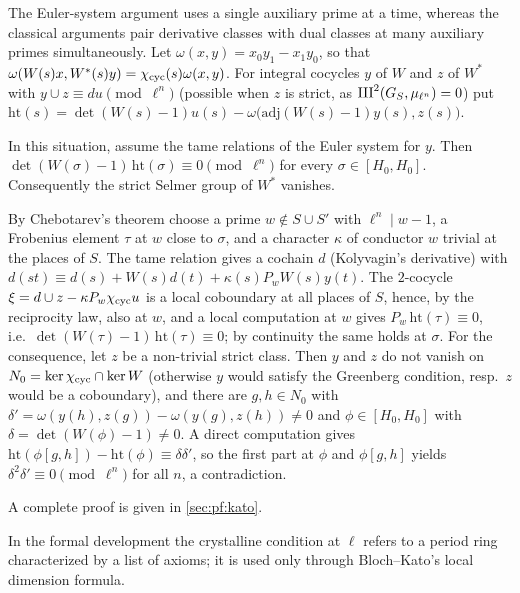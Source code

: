 The Euler-system argument uses a single auxiliary prime at a time, whereas the classical arguments
\cite{Kolyvagin1990,Rubin2000} pair derivative classes with dual classes at many auxiliary primes simultaneously. Let
$\omega(x,y)=x_0y_1-x_1y_0$, so that
$\omega(W(s)x,W^*(s)y)=\chi_{\mathrm{cyc}}(s)\omega(x,y)$. For integral cocycles $y$ of $W$ and $z$ of $W^*$ with
$y\cup z\equiv du\pmod{\ell^n}$ (possible when $z$ is strict, as $\mathrm{III}^2(G_S,\mu_{\ell^n})=0$) put
$\mathrm{ht}(s)=\det(W(s)-1)u(s)-\omega\bigl(\mathrm{adj}(W(s)-1)y(s),z(s)\bigr)$.

\begin{lemma}\Fmark\label{lem:window:heights}
In this situation, assume the tame relations of the Euler system for $y$. Then
$\det(W(\sigma)-1)\,\mathrm{ht}(\sigma)\equiv0\pmod{\ell^n}$ for every $\sigma\in[H_0,H_0]$. Consequently the strict
Selmer group of $W^*$ vanishes.
\end{lemma}

\begin{proofoutline}
By Chebotarev's theorem choose a prime $w\notin S\cup S'$ with $\ell^n\mid w-1$, a Frobenius element $\tau$ at $w$
close to $\sigma$, and a character $\kappa$ of conductor $w$ trivial at the places of $S$. The tame relation gives a
cochain $d$ (Kolyvagin's derivative) with $d(st)\equiv d(s)+W(s)d(t)+\kappa(s)P_wW(s)y(t)$. The $2$-cocycle
$\xi=d\cup z-\kappa P_w\chi_{\mathrm{cyc}} u$ is a local coboundary at all places of $S$, hence, by the reciprocity law, also
at $w$, and a local computation at $w$ gives $P_w\,\mathrm{ht}(\tau)\equiv0$, i.e.\
$\det(W(\tau)-1)\,\mathrm{ht}(\tau)\equiv0$; by continuity the same holds at $\sigma$. For the consequence, let $z$ be a
non-trivial strict class. Then $y$ and $z$ do not vanish on $N_0=\ker\chi_{\mathrm{cyc}}\cap\ker W$ (otherwise $y$ would
satisfy the Greenberg condition, resp.\ $z$ would be a coboundary), and there are $g,h\in N_0$ with
$\delta'=\omega(y(h),z(g))-\omega(y(g),z(h))\ne0$ and $\phi\in[H_0,H_0]$ with $\delta=\det(W(\phi)-1)\ne0$. A direct
computation gives $\mathrm{ht}(\phi[g,h])-\mathrm{ht}(\phi)\equiv\delta\delta'$, so the first part at $\phi$ and
$\phi[g,h]$ yields $\delta^2\delta'\equiv0\pmod{\ell^n}$ for all $n$, a contradiction.

A complete proof is given in \cref{sec:pf:kato}.
\end{proofoutline}

In the formal development the crystalline condition at $\ell$ refers to a period ring characterized by a list of
axioms; it is used only through Bloch--Kato's local dimension formula.
